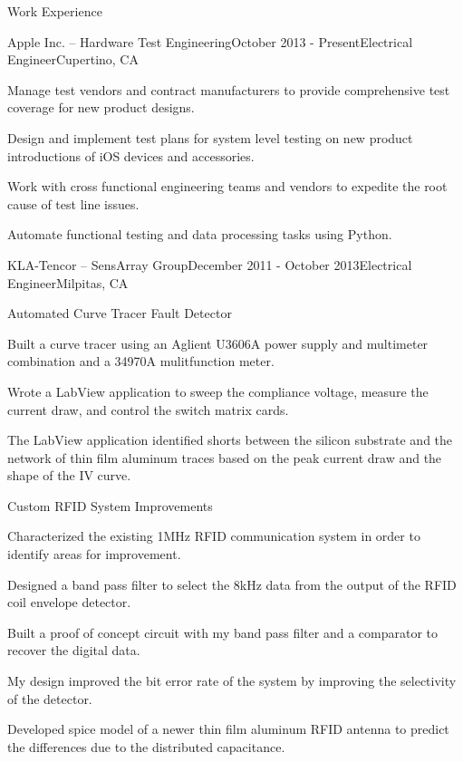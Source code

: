 \documentclass{resume} %
\begin{document}

\begin{rSection}{Work Experience}
\begin{rSubsection}{Apple Inc. -- Hardware Test Engineering}{October 2013 - Present}{Electrical Engineer}{Cupertino, CA}
\item Manage test vendors and contract manufacturers to provide comprehensive test coverage for new product designs.
\item Design and implement test plans for system level testing on new product introductions of iOS devices and accessories.
\item Work with cross functional engineering teams and vendors to expedite the root cause of test line issues.
\item Automate functional testing and data processing tasks using Python.
\end{rSubsection}


\begin{rSubsection2}{KLA-Tencor -- SensArray Group}{December 2011 - October 2013}{Electrical Engineer}{Milpitas, CA}

\pagebreak[2]
\begin{rWorkProject}{Automated Curve Tracer Fault Detector}
\item Built a curve tracer using an Aglient U3606A power supply and multimeter combination and a 34970A mulitfunction meter.
\item Wrote a LabView application to sweep the compliance voltage, measure the current draw, and control the switch matrix cards.
\item The LabView application identified shorts between the silicon substrate and the network of thin film aluminum traces based on the peak current draw and the shape of the IV curve.
\end{rWorkProject}

\pagebreak[1]
\begin{rWorkProject}{Custom RFID System Improvements}
\item Characterized the existing 1MHz RFID communication system in order to identify areas for improvement.
\item Designed a band pass filter to select the 8kHz data from the output of the RFID coil envelope detector.
\item Built a proof of concept circuit with my band pass filter and a comparator to recover the digital data.
\item My design improved the bit error rate of the system by improving the selectivity of the detector.
\item Developed spice model of a newer thin film aluminum RFID antenna to predict the differences due to the distributed capacitance.
\end{rWorkProject}


\end{rSubsection2}
\end{rSection}
\end{document}
